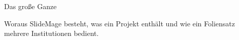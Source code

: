 

\begin{sectionframe}{Das große Ganze}
	\begin{minipage}[t]{0.72\linewidth}\small
		Woraus SlideMage besteht, was ein Projekt enthält und wie ein Foliensatz
		mehrere Institutionen bedient.
	\end{minipage}\par\medskip
	\SMChapterAgenda[0.72\linewidth]
\end{sectionframe}
